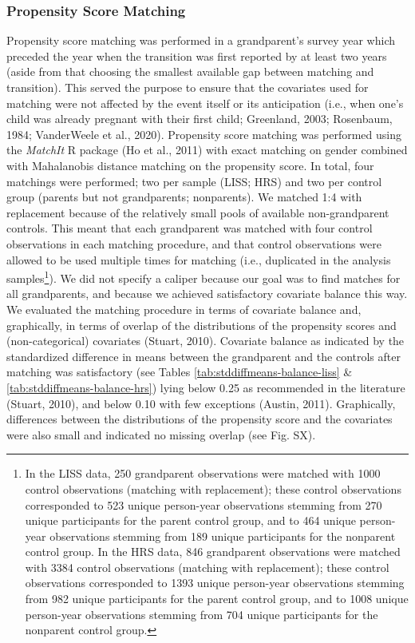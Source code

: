 \documentclass[
  english,
  man, noextraspace]{apa7}
\begin{document}
\hypertarget{propensity-score-matching}{%
\subsubsection{Propensity Score Matching}\label{propensity-score-matching}}

Propensity score matching was performed in a grandparent's survey year which preceded the year when the transition was first reported by at least two years (aside from that choosing the smallest available gap between matching and transition). This served the purpose to ensure that the covariates used for matching were not affected by the event itself or its anticipation (i.e., when one's child was already pregnant with their first child; Greenland, 2003; Rosenbaum, 1984; VanderWeele et al., 2020). Propensity score matching was performed using the \emph{MatchIt} R package (Ho et al., 2011) with exact matching on gender combined with Mahalanobis distance matching on the propensity score. In total, four matchings were performed; two per sample (LISS; HRS) and two per control group (parents but not grandparents; nonparents). We matched 1:4 with replacement because of the relatively small pools of available non-grandparent controls. This meant that each grandparent was matched with four control observations in each matching procedure, and that control observations were allowed to be used multiple times for matching (i.e., duplicated in the analysis samples\footnote{In the LISS data, 250 grandparent observations were matched with 1000 control observations (matching with replacement); these control observations corresponded to 523 unique person-year observations stemming from 270 unique participants for the parent control group, and to 464 unique person-year observations stemming from 189 unique participants for the nonparent control group. In the HRS data, 846 grandparent observations were matched with 3384 control observations (matching with replacement); these control observations corresponded to 1393 unique person-year observations stemming from 982 unique participants for the parent control group, and to 1008 unique person-year observations stemming from 704 unique participants for the nonparent control group.}). We did not specify a caliper because our goal was to find matches for all grandparents, and because we achieved satisfactory covariate balance this way.\\
We evaluated the matching procedure in terms of covariate balance and, graphically, in terms of overlap of the distributions of the propensity scores and (non-categorical) covariates (Stuart, 2010). Covariate balance as indicated by the standardized difference in means between the grandparent and the controls after matching was satisfactory (see Tables \ref{tab:stddiffmeans-balance-liss} \& \ref{tab:stddiffmeans-balance-hrs}) lying below 0.25 as recommended in the literature (Stuart, 2010), and below 0.10 with few exceptions (Austin, 2011). Graphically, differences between the distributions of the propensity score and the covariates were also small and indicated no missing overlap (see Fig. SX).\\
\end{document}
